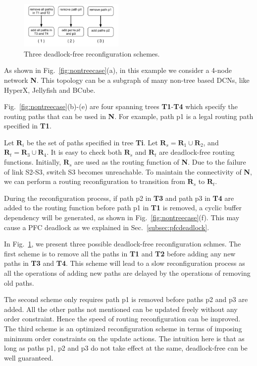 \begin{figure}[t]
	\centering
	\includegraphics[width=0.45\textwidth] {figs/dfschemes}
	\caption{Three deadlock-free reconfiguration schemes.}\label{fig:dfschemes}
	
\end{figure}

As shown in Fig.~\ref{fig:nontreecase}(a), in this example we consider a 4-node network \textbf{N}. This topology can be a subgraph of many non-tree based DCNs, like HyperX, Jellyfish and BCube.

Fig.~\ref{fig:nontreecase}(b)-(e) are four spanning trees \textbf{T1}-\textbf{T4} which specify the routing paths that can be used in \textbf{N}. For example, path p1 is a legal routing path specified in \textbf{T1}.  

Let $\textbf{R}_i$ be the set of paths specified in tree \textbf{Ti}. Let $\textbf{R}_s = \textbf{R}_1 \cup \textbf{R}_2$, and $\textbf{R}_t = \textbf{R}_3 \cup \textbf{R}_4$. It is easy to check both $\textbf{R}_s$ and $\textbf{R}_t$ are deadlock-free routing functions. Initially,  $\textbf{R}_s$ are used as the routing function of \textbf{N}. Due to the failure of link S2-S3, switch S3 becomes unreachable. To maintain the connectivity of \textbf{N}, we can perform a routing reconfiguration to transition from $\textbf{R}_s$ to $\textbf{R}_t$.

During the reconfiguration process, if path p2 in \textbf{T3} and path p3 in \textbf{T4} are added to the routing function before path p1 in \textbf{T1} is removed, a cyclic buffer dependency will be generated, as shown in Fig.~\ref{fig:nontreecase}(f). This may cause a PFC deadlock as we explained in Sec.~\ref{subsec:pfcdeadlock}.

In Fig.~\ref{fig:dfschemes}, we present three possible deadlock-free reconfiguration schmes. The first scheme is to remove all the paths in \textbf{T1} and \textbf{T2} before adding any new paths in \textbf{T3} and \textbf{T4}. This scheme will lead to a slow reconfiguration process as all the operations of adding new paths are delayed by the operations of removing old paths. 

The second scheme only requires path p1 is removed before paths p2 and p3 are added. All the other paths not mentioned can be updated freely without any order constraint. Hence the speed of routing reconfiguration can be improved. The third scheme is an optimized reconfiguration scheme in terms of imposing minimum order constraints on the update actions. The intuition here is that as long as paths p1, p2 and p3 do not take effect at the same, deadlock-free can be well guaranteed. 

